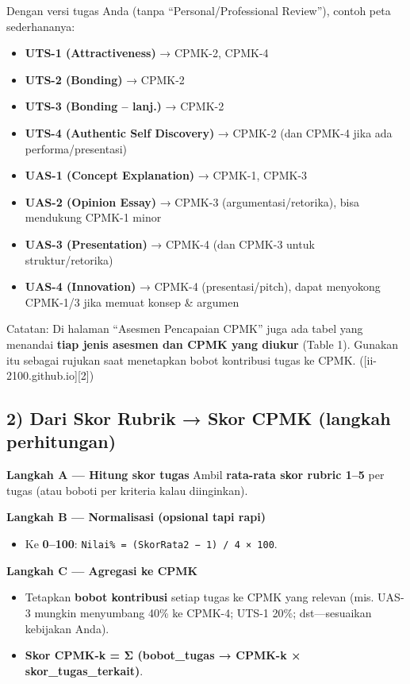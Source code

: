 \documentclass[
  letterpaper,
  DIV=11,
  numbers=noendperiod]{scrreprt}
\providecommand{\tightlist}{%
  \setlength{\itemsep}{0pt}\setlength{\parskip}{0pt}}
\begin{document}
Dengan versi tugas Anda (tanpa ``Personal/Professional Review''), contoh
peta sederhananya:

\begin{itemize}
\tightlist
\item
  \textbf{UTS-1 (Attractiveness)} → CPMK-2, CPMK-4
\item
  \textbf{UTS-2 (Bonding)} → CPMK-2
\item
  \textbf{UTS-3 (Bonding -- lanj.)} → CPMK-2
\item
  \textbf{UTS-4 (Authentic Self Discovery)} → CPMK-2 (dan CPMK-4 jika
  ada performa/presentasi)
\item
  \textbf{UAS-1 (Concept Explanation)} → CPMK-1, CPMK-3
\item
  \textbf{UAS-2 (Opinion Essay)} → CPMK-3 (argumentasi/retorika), bisa
  mendukung CPMK-1 minor
\item
  \textbf{UAS-3 (Presentation)} → CPMK-4 (dan CPMK-3 untuk
  struktur/retorika)
\item
  \textbf{UAS-4 (Innovation)} → CPMK-4 (presentasi/pitch), dapat
  menyokong CPMK-1/3 jika memuat konsep \& argumen
\end{itemize}

Catatan: Di halaman ``Asesmen Pencapaian CPMK'' juga ada tabel yang
menandai \textbf{tiap jenis asesmen dan CPMK yang diukur} (Table 1).
Gunakan itu sebagai rujukan saat menetapkan bobot kontribusi tugas ke
CPMK. ({[}ii-2100.github.io{]}{[}2{]})

\subsection*{2) Dari Skor Rubrik → Skor CPMK (langkah
perhitungan)}\label{dari-skor-rubrik-skor-cpmk-langkah-perhitungan}

\textbf{Langkah A --- Hitung skor tugas} Ambil \textbf{rata-rata skor
rubric 1--5} per tugas (atau boboti per kriteria kalau diinginkan).

\textbf{Langkah B --- Normalisasi (opsional tapi rapi)}

\begin{itemize}
\tightlist
\item
  Ke \textbf{0--100}:
  \texttt{Nilai\%\ =\ (SkorRata2\ −\ 1)\ /\ 4\ ×\ 100}.
\end{itemize}

\textbf{Langkah C --- Agregasi ke CPMK}

\begin{itemize}
\tightlist
\item
  Tetapkan \textbf{bobot kontribusi} setiap tugas ke CPMK yang relevan
  (mis. UAS-3 mungkin menyumbang 40\% ke CPMK-4; UTS-1 20\%;
  dst---sesuaikan kebijakan Anda).
\item
  \textbf{Skor CPMK-k = Σ (bobot\_tugas → CPMK-k ×
  skor\_tugas\_terkait)}.
\end{itemize}
\end{document}
